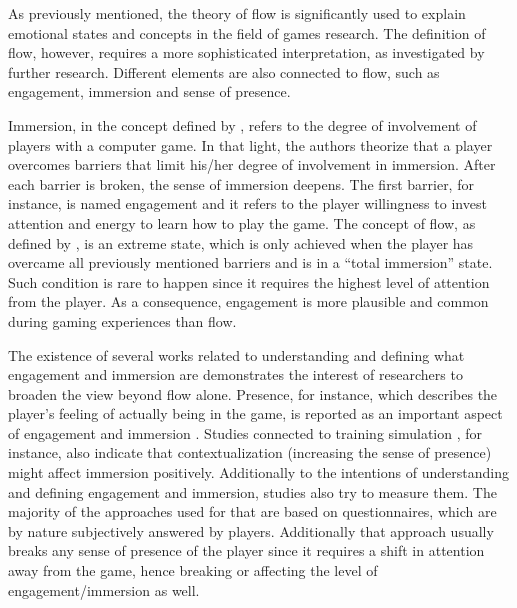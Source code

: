 As previously mentioned, the theory of flow is significantly used to explain emotional states and concepts in the field of games research. The definition of flow, however, requires a more sophisticated interpretation, as investigated by further research. %
Different elements are also connected to flow, such as engagement, immersion and sense of presence.

Immersion, in the concept defined by \textcite{brown2004grounded}, refers to the degree of involvement of players with a computer game. In that light, the authors theorize that a player overcomes barriers that limit his/her degree of involvement in immersion. After each barrier is broken, the sense of immersion deepens. The first barrier, for instance, is named engagement and it refers to the player willingness to invest attention and energy to learn how to play the game. The concept of flow, as defined by \textcite{csikszentmihalyi1991flow}, is an extreme state, which is only achieved when the player has overcame all previously mentioned barriers and is in a ``total immersion'' state. Such condition is rare to happen since it requires the highest level of attention from the player. As a consequence, engagement is more plausible and common during gaming experiences than flow.

The existence of several works \parencite{boyle2012engagement} related to understanding and defining what engagement and immersion are demonstrates the interest of researchers to broaden the view beyond flow alone. Presence, for instance, which describes the player's feeling of actually being in the game, is reported as an important aspect of engagement and immersion \parencite{weibel2011immersion}. Studies connected to training simulation \parencite{engstrom2016impact}, for instance, also indicate that contextualization (increasing the sense of presence) might affect immersion positively. Additionally to the intentions of understanding and defining engagement and immersion, studies also try to measure them. The majority of the approaches used for that are based on questionnaires, which are by nature subjectively answered by players. Additionally that approach usually breaks any sense of presence of the player since it requires a shift in attention away from the game, hence breaking or affecting the level of engagement/immersion as well.

